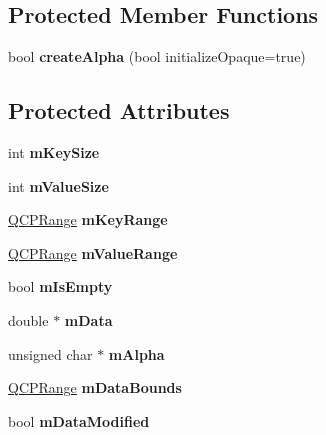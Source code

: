 \subsection*{Protected Member Functions}
\begin{DoxyCompactItemize}
\item 
\mbox{\label{classQCPColorMapData_a42c2b1c303683515fa4de4c551f54441}} 
bool {\bfseries create\+Alpha} (bool initialize\+Opaque=true)
\end{DoxyCompactItemize}
\subsection*{Protected Attributes}
\begin{DoxyCompactItemize}
\item 
\mbox{\label{classQCPColorMapData_a354e06462023340fbc03894b22499f6d}} 
int {\bfseries m\+Key\+Size}
\item 
\mbox{\label{classQCPColorMapData_ae8ee9093632a59f55eb4fc06579ed256}} 
int {\bfseries m\+Value\+Size}
\item 
\mbox{\label{classQCPColorMapData_aaaafd0d7d0f153dbd152f3daf34254ee}} 
\hyperlink{classQCPRange}{Q\+C\+P\+Range} {\bfseries m\+Key\+Range}
\item 
\mbox{\label{classQCPColorMapData_a225bb96f10c1a27b51ae59249477dbef}} 
\hyperlink{classQCPRange}{Q\+C\+P\+Range} {\bfseries m\+Value\+Range}
\item 
\mbox{\label{classQCPColorMapData_a10e91aa89ed05bd177b1f81e07b465b8}} 
bool {\bfseries m\+Is\+Empty}
\item 
\mbox{\label{classQCPColorMapData_ac1682862022f575191351c9825187d39}} 
double $\ast$ {\bfseries m\+Data}
\item 
\mbox{\label{classQCPColorMapData_a2146560b3a61a41186f9aa5ed9ec37a6}} 
unsigned char $\ast$ {\bfseries m\+Alpha}
\item 
\mbox{\label{classQCPColorMapData_a1798b3dcc0a27091d196bfd156dcb3f2}} 
\hyperlink{classQCPRange}{Q\+C\+P\+Range} {\bfseries m\+Data\+Bounds}
\item 
\mbox{\label{classQCPColorMapData_ad3cc682da2ac14e5acdbc05cf4d3d93b}} 
bool {\bfseries m\+Data\+Modified}
\end{DoxyCompactItemize}
